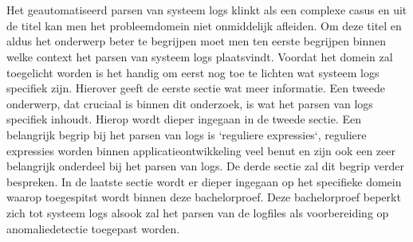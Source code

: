 
\chapter{}
\label{ch:inleiding}



Het geautomatiseerd parsen van systeem logs klinkt als een complexe casus en uit de titel kan men het probleemdomein niet onmiddelijk afleiden. Om deze titel en aldus het onderwerp beter te begrijpen moet men ten eerste begrijpen binnen welke context het parsen van systeem logs plaatsvindt. Voordat het domein zal toegelicht worden is het handig om eerst nog toe te lichten wat systeem logs specifiek zijn. Hierover geeft de eerste sectie wat meer informatie. Een tweede onderwerp, dat cruciaal is binnen dit onderzoek, is wat het parsen van logs specifiek inhoudt. Hierop wordt dieper ingegaan in de tweede sectie. Een belangrijk begrip bij het parsen van logs is `reguliere expressies`, reguliere expressies worden binnen applicatieontwikkeling veel benut en zijn ook een zeer belangrijk onderdeel bij het parsen van logs. De derde sectie zal dit begrip verder bespreken. In de laatste sectie wordt er dieper ingegaan op het specifieke domein waarop toegespitst wordt binnen deze bachelorproef. Deze bachelorproef beperkt zich tot systeem logs alsook zal het parsen van de logfiles als voorbereiding op anomaliedetectie toegepast worden. 

